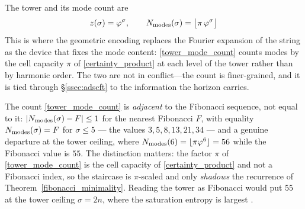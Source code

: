 The tower and its mode count are
\begin{equation}\label{tower_mode_count}
  z(\sigma)=\varphi^{\sigma},\qquad N_{\mathrm{modes}}(\sigma)=\big\lfloor\pi\,\varphi^{\sigma}\big\rfloor
\end{equation}
This is where the geometric encoding replaces the Fourier expansion of the string as the
device that fixes the mode content: \eqref{tower_mode_count} counts modes by the cell capacity
$\pi$ of \eqref{certainty_product} at each level of the tower rather than by harmonic order. The
two are not in conflict---the count is finer-grained, and it is tied through
\S\ref{ssec:adscft} to the information the horizon carries.

\begin{remark}\label{rmk:fib-adjacent}
The count \eqref{tower_mode_count} is \emph{adjacent} to the Fibonacci sequence, not equal to it:
$\lvert N_{\mathrm{modes}}(\sigma)-F\rvert\le1$ for the nearest Fibonacci $F$, with equality
$N_{\mathrm{modes}}(\sigma)=F$ for $\sigma\le5$ --- the values $3,5,8,13,21,34$ --- and a genuine departure at
the tower ceiling, where $N_{\mathrm{modes}}(6)=\lfloor\pi\varphi^{6}\rfloor=56$ while the Fibonacci value is
$55$. The distinction matters: the factor $\pi$ of \eqref{tower_mode_count} is the cell capacity of
\eqref{certainty_product} and not a Fibonacci index, so the staircase is $\pi$-scaled and only
\emph{shadows} the recurrence of Theorem~\ref{fibonacci_minimality}. Reading the tower as Fibonacci would
put $55$ at the tower ceiling $\sigma=2n$, where the saturation entropy is largest .


\end{remark}

